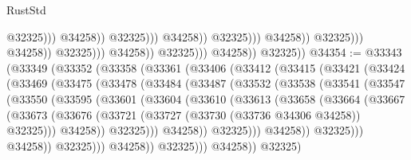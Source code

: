 \begin{lexlean}{RustStd}
\begin{coremodule}
                                                                    @32325)))
                                                              @34258))
                                                          @32325)))
                                                    @34258))
                                                @32325)))
                                          @34258))
                                      @32325)))
                                @34258))
                            @32325)))
                      @34258))
                  @32325)))
            @34258))
        @32325))
@34354 := @33343
    (@33349
      (@33352
        (@33358
          (@33361
            (@33406
              (@33412
                (@33415
                  (@33421
                    (@33424
                      (@33469
                        (@33475
                          (@33478
                            (@33484
                              (@33487
                                (@33532
                                  (@33538
                                    (@33541
                                      (@33547
                                        (@33550
                                          (@33595
                                            (@33601
                                              (@33604
                                                (@33610
                                                  (@33613
                                                    (@33658
                                                      (@33664
                                                        (@33667
                                                          (@33673
                                                            (@33676
                                                              (@33721
                                                                (@33727
                                                                  (@33730 (@33736 @34306 @34258))
                                                                  @32325)))
                                                            @34258))
                                                        @32325)))
                                                  @34258))
                                              @32325)))
                                        @34258))
                                    @32325)))
                              @34258))
                          @32325)))
                    @34258))
                @32325)))
          @34258))
      @32325)

\end{coremodule}
\end{lexlean}
